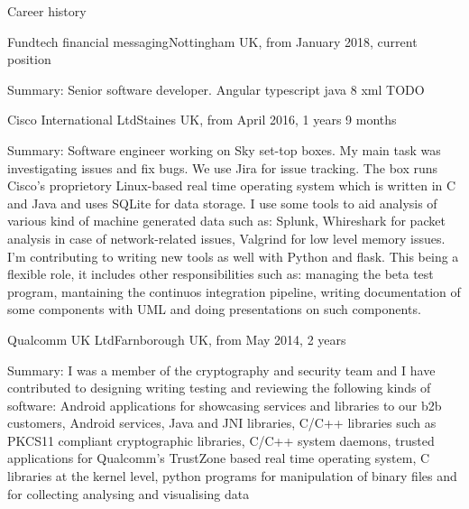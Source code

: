 \documentclass{resume}
\begin{document}
  \begin{rSection}{Career history}
     
    \begin{rSubsection}{Fundtech financial messaging}{Nottingham UK, from January 2018, current position}{}{}
    \item[Summary:]
      Senior software developer.
	Angular typescript java 8 xml 
	    TODO
    \end{rSubsection}

   
    \begin{rSubsection}{Cisco International Ltd}{Staines UK, from April 2016, 1 years 9 months}{}{}
    \item[Summary:]
      Software engineer working on Sky set-top boxes.
      My main task was investigating issues and fix bugs. 
      We use Jira for issue tracking. 
      The box runs Cisco's proprietory Linux-based real time operating system which is written in C and Java and uses SQLite for data storage.
      I use some tools to aid analysis of various kind of machine generated data such as: Splunk, Whireshark for packet analysis in case of network-related issues, Valgrind for low level memory issues.
      I'm contributing to writing new tools as well with Python and flask.
      This being a flexible role, it includes other responsibilities such as: managing the beta test program, mantaining the continuos integration pipeline, writing documentation of some components with UML and doing presentations on such components.
    \end{rSubsection}

    \begin{rSubsection}{Qualcomm UK Ltd}{Farnborough UK, from May 2014, 2 years}{}{}
	\item[Summary:]
	  I was a member of the cryptography and security team and I have contributed to designing writing testing and reviewing the following kinds of software:
	  Android applications for showcasing services and libraries to our b2b customers,
	  Android services, 
	  Java and JNI libraries, 
	  C/C++ libraries such as PKCS11 compliant cryptographic libraries,
	  C/C++ system daemons,
	  trusted applications for Qualcomm's TrustZone based real time operating system,
	  C libraries at the kernel level,
	  python programs for manipulation of binary files and for collecting analysing and visualising data


\end{rSubsection}
\end{rSection}
\end{document}

